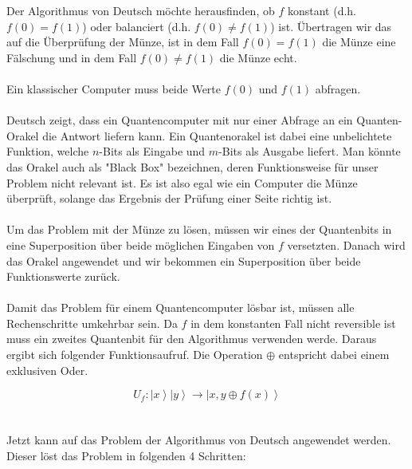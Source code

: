 Der Algorithmus von Deutsch möchte herausfinden, ob $f$ konstant (d.h. $f(0)=f(1)$) oder balanciert (d.h. $f(0)\neq f(1)$) ist. Übertragen wir das auf die Überprüfung der Münze, ist in dem Fall $f(0) = f(1)$ die Münze eine Fälschung und in dem Fall $f(0) \neq f(1)$ die Münze echt. \\
\\
Ein klassischer Computer muss beide Werte $f(0)$ und $f(1)$ abfragen. \\
\\
Deutsch zeigt, dass ein Quantencomputer mit nur einer Abfrage an ein Quanten-Orakel die Antwort liefern kann. Ein Quantenorakel ist dabei eine unbelichtete Funktion, welche $n$-Bits als Eingabe und $m$-Bits als Ausgabe liefert. Man könnte das Orakel auch als "Black Box" bezeichnen, deren Funktionsweise für unser Problem nicht relevant ist. Es ist also egal wie ein Computer die Münze überprüft, solange das Ergebnis der Prüfung einer Seite richtig ist. \\
\\
Um das Problem mit der Münze zu lösen, müssen wir eines der Quantenbits in eine Superposition über beide möglichen Eingaben von $f$ versetzten. Danach wird das Orakel angewendet und wir bekommen ein Superposition über beide Funktionswerte zurück.\\
\\
Damit das Problem für einem Quantencomputer lösbar ist, müssen alle Rechenschritte umkehrbar sein. Da $f$ in dem konstanten Fall nicht reversible ist muss ein zweites Quantenbit für den Algorithmus verwenden werde. Daraus ergibt sich folgender Funktionsaufruf. Die Operation $\oplus$ entspricht dabei einem exklusiven Oder.

$$
U_f: \left|x\right\rangle\left| y\right\rangle \rightarrow  \left|x, y \oplus f(x)\right\rangle
$$\\
\\
Jetzt kann auf das Problem der Algorithmus von Deutsch angewendet werden. Dieser löst das Problem in folgenden 4 Schritten:

